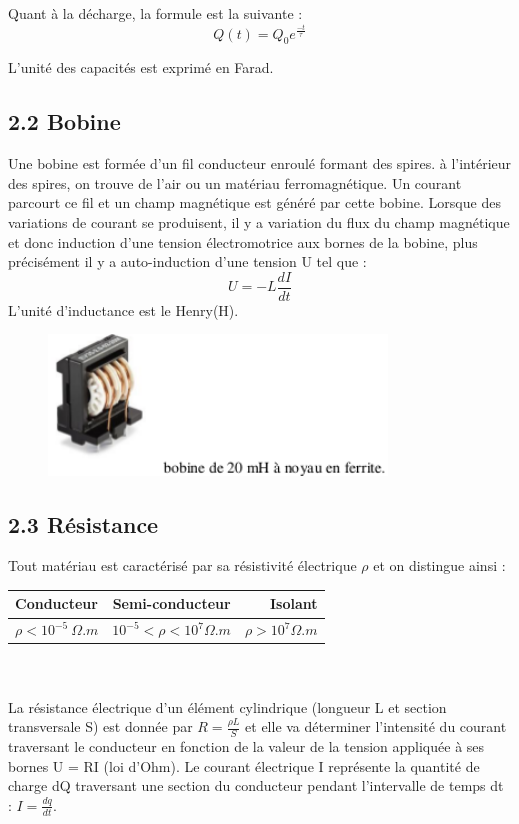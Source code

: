 \documentclass{report}
\begin{document}
Quant \`a la d\'echarge, la formule est la suivante :
\begin{equation}
    Q(t) = Q_{0}e^{\frac{-t}{\tau}}
\end{equation}

L'unit\'e des capacit\'es est exprim\'e en Farad.

\subsection*{2.2 Bobine}
Une bobine est formée d’un fil conducteur enroulé formant des spires. à l’intérieur des spires, on trouve de l’air ou un matériau ferromagnétique. Un courant parcourt ce fil et un champ magnétique est généré par cette bobine. Lorsque des variations de courant se produisent, il y a variation du flux du champ magnétique et donc induction d’une tension électromotrice aux bornes de la
bobine, plus précisément il y a auto-induction d’une tension U tel que
: 
\begin{equation}
    U = -L\frac{dI}{dt}
\end{equation}
L'unité d'inductance est le Henry(H).
\begin{figure}[ht!]
\centering
\includegraphics[width=90mm]{bobine.png}
\label{overflow}
\end{figure}
\subsection*{2.3 Résistance}
\hspace*{0.5cm}
Tout matériau est caractérisé par sa résistivité électrique $\rho$ et on distingue ainsi : \\

\begin{tabular}{|l|c|r|}
  \hline
  Conducteur & Semi-conducteur  & Isolant \\
  \hline
  $\rho <  10^{-5} \ \Omega .m $ & $10^{-5} < \rho < 10^{7} \Omega.m $ & $\rho > 10^{7} \Omega.m $\\
  \hline
\end{tabular}
\\ \\
La résistance électrique d’un élément cylindrique (longueur L et section transversale S) est donnée par $R = \frac{\rho L}{S} $ et elle va 
déterminer l'intensité du courant traversant le conducteur en fonction de la valeur de la tension appliquée à ses bornes U = RI (loi d'Ohm).
Le courant électrique I représente la quantité de charge dQ traversant une section du conducteur pendant l'intervalle de temps dt :  $I = \frac{dq}{dt} $.
\end{document}
